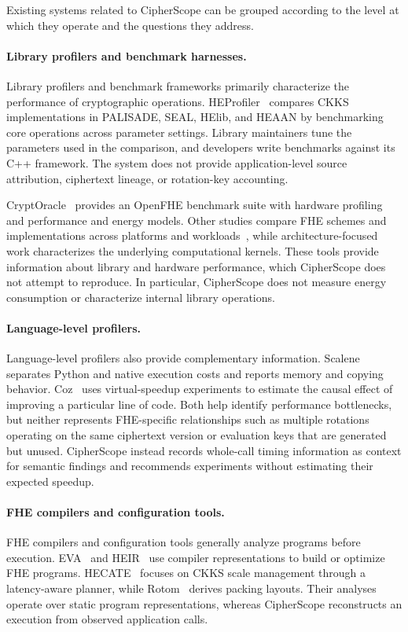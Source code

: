 \documentclass[pdflatex,sn-basic,Numbered,iicol]{sn-jnl}
\begin{document}
Existing systems related to CipherScope can be grouped according to the level
at which they operate and the questions they address.

\paragraph{Library profilers and benchmark harnesses.} Library profilers and
benchmark frameworks primarily characterize the performance of cryptographic
operations. HEProfiler~\cite{takeshita2025heprofiler} compares CKKS
implementations in PALISADE, SEAL, HElib, and HEAAN by benchmarking core
operations across parameter settings. Library maintainers tune the parameters
used in the comparison, and developers write benchmarks against its C++
framework. The system does not provide application-level source attribution,
ciphertext lineage, or rotation-key accounting.

CryptOracle~\cite{cryptoracle2025} provides an OpenFHE benchmark suite with
hardware profiling and performance and energy models. Other studies compare
FHE schemes and implementations across platforms and
workloads~\cite{crossplatform2025,safetycentric2025}, while architecture-focused
work characterizes the underlying computational kernels. These tools provide
information about library and hardware performance, which CipherScope does
not attempt to reproduce. In particular, CipherScope does not measure energy
consumption or characterize internal library operations.

\paragraph{Language-level profilers.} Language-level profilers also provide
complementary information. Scalene~\cite{berger2023scalene} separates Python
and native execution costs and reports memory and copying behavior.
Coz~\cite{curtsinger2015coz} uses virtual-speedup experiments to estimate the
causal effect of improving a particular line of code. Both help identify
performance bottlenecks, but neither represents FHE-specific relationships
such as multiple rotations operating on the same ciphertext version or
evaluation keys that are generated but unused. CipherScope instead records
whole-call timing information as context for semantic findings and recommends
experiments without estimating their expected speedup.

\paragraph{FHE compilers and configuration tools.} FHE compilers and
configuration tools generally analyze programs before execution.
EVA~\cite{dathathri2020eva} and HEIR~\cite{heir2025} use compiler
representations to build or optimize FHE programs. HECATE~\cite{hecate2022}
focuses on CKKS scale management through a latency-aware planner, while
Rotom~\cite{rotom2026} derives packing layouts. Their analyses operate over
static program representations, whereas CipherScope reconstructs an execution
from observed application calls.
\end{document}
